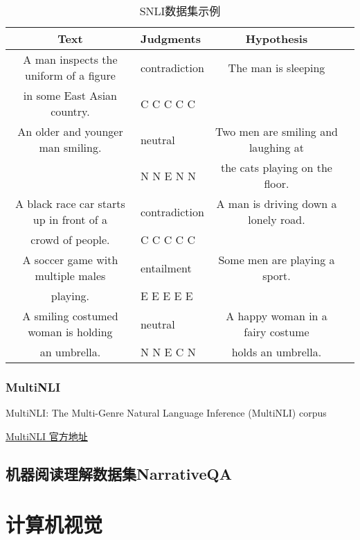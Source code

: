 \begin{table}[!htb]
  \centering
  \begin{tabular}{|Sl|c|l|}
  \hline
  \tableheadcolor \textbf{Text} & \textbf{Judgments} & \textbf{Hypothesis} \\ \hline
  A man inspects the uniform of a figure & contradiction & The man is sleeping \\
  in some East Asian country.            &   C C C C C   & \\ \hline

  An older and younger man smiling. &  neutral  & Two men are smiling and laughing at \\
                                    & N N E N N & the cats playing on the floor. \\ \hline

  A black race car starts up in front of a & contradiction & A man is driving down a lonely road. \\
  crowd of people.                         &   C C C C C   & \\ \hline

  A soccer game with multiple males & entailment & Some men are playing a sport. \\
  playing.                          &  E E E E E & \\ \hline

  A smiling costumed woman is holding &  neutral  & A happy woman in a fairy costume \\
  an umbrella.                        & N N E C N & holds an umbrella. \\ \hline
  \end{tabular}
  \caption{SNLI数据集示例}
  \label{table:SNLI-sample}
\end{table}

\subsubsection{MultiNLI}
MultiNLI: The Multi-Genre Natural Language Inference (MultiNLI) corpus

\href{https://www.nyu.edu/projects/bowman/multinli/}{MultiNLI 官方地址}


\subsection{机器阅读理解数据集NarrativeQA}

\section{计算机视觉}

